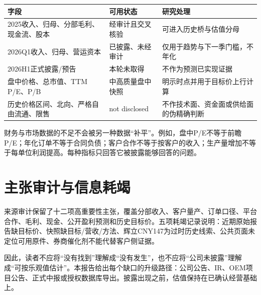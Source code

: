 \begin{exhibitbox}[关键数据质量]
\small
\begin{tabularx}{\textwidth}{L{3cm}Y Y}
\toprule
字段 & 可用状态 & 研究处理 \\
\midrule
2025收入、归母、分部毛利、现金流、股本 & 经审计且交叉核验 & 可进入历史桥与估值分母 \\
2026Q1收入、归母、营运资本 & 已披露、未经审计 & 仅用于趋势与下一季门槛，不年化 \\
2026H1正式披露/预告 & 本轮未取得 & 不作为预测已实现证据 \\
盘中价格、总市值、TTM P/E、P/B & 中高质量盘中快照 & 明示时点并用于目标价上行计算 \\
历史价格区间、北向、严格自由流通、限售 & not disclosed & 不作技术面、资金面或供给面的伪精确判断 \\
\bottomrule
\end{tabularx}
\end{exhibitbox}

财务与市场数据的不足不会被另一种数据“补平”。例如，盘中P/E不等于前瞻P/E；年化订单不等于合同负债；客户合作不等于按客户的收入；生产量增加不等于每单位利润提高。每种指标只回答它被披露能够回答的问题。

\section{主张审计与信息耗竭}

来源审计保留了十二项高重要性主张，覆盖分部收入、客户量产、订单口径、平台合作、毛利、现金、公开盈利预测和历史目标价。五项耗竭记录说明：近期原始报告缺目标价、快照缺目标/营收/方法、辉立CNY147为过时历史线索、公共页面未定位可用原件、券商催化剂不能代替客户侧证据。

因此，读者不应将“没有找到”理解成“没有发生”，也不应将“公司未披露”理解成“可按乐观值估计”。本报告给出每个缺口的升级路径：公司公告、IR、OEM项目公告、正式中报或授权数据库导出。披露出现之前，估值保持在已确认经营基础上。
